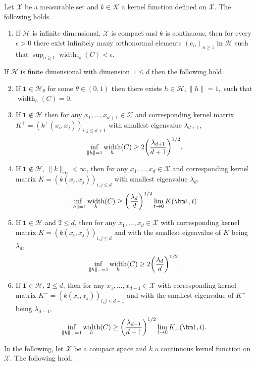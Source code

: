 \documentclass[AHL,Unicode,longabstracts,published]{cedram}
\theoremstyle{remark}
\DeclareMathOperator{\diam}{width}
\newcommand{\X}{\mathcal{X}}
\newcommand{\cH}{\mathcal{H}}
\newcommand{\clK}{\mathcal{K}}
\renewcommand*{\to}{\mathchoice{\longrightarrow}{\rightarrow}{\rightarrow}{\rightarrow}}
\let\originalleft\left
\let\originalright\right
\renewcommand{\left}{\mathopen{}\mathclose\bgroup\originalleft}
\renewcommand{\right}{\aftergroup\egroup\originalright}
\begin{document}
\begin{prop}\label{prop:approx_lower_bnd}
Let $\X$ be a measurable set and $k \in \clK$ a kernel function defined on $\X$. The following holds.
\begin{enumerate}
\item\label{prop2.10.1} If $\cH$ is infinite dimensional, $\X$ is compact and $k$ is continuous, then for every $\epsilon>0$ there exist infinitely many orthonormal elements $(e_n)_{n \geq 1}$ in $\cH$ such that $\sup_{n \geq 1} \diam_{e_n}(C) < \epsilon$.
\end{enumerate}
If $\cH$ is finite dimensional with dimension~$1 \leq d$ then the following hold.
\begin{enumerate}
\setcounter{enumi}{1}
\item\label{prop2.10.2} If $\bm 1 \in \cH_\theta$ for some $\theta\in (0,1)$ then there exists $h\in\cH, \|h\|=1,$ such that $\diam_h(C) = 0$.
\item\label{prop2.10.3} If $\bm 1 \not \in \cH$ then for any $x_1, \dots, x_{d+1} \in \X$ and corresponding kernel matrix $K^+ = (k^+(x_i,x_j))_{i,j\leq d+1}$ with smallest eigenvalue $\lambda_{d+1}$,
\[
\inf_{\|h\| = 1} \diam_h(C) \geq 2 \left(\frac{\lambda_{d+1}}{d+1}\right)^{1/2}.
\]
\item\label{prop2.10.4} If $\bm 1 \not \in \cH$, $\|k\|_\infty<\infty$, then for any $x_1, \dots, x_{d} \in \X$ and corresponding kernel matrix $K = (k(x_i,x_j))_{i,j\leq d}$ with smallest eigenvalue $\lambda_{d}$,
\[
\inf_{\|h\| = 1} \diam_h(C) \geq \left(\frac{\lambda_{d}}{d}\right)^{1/2} \lim_{t\to 0} K(\bm 1,t).
\]
\item\label{prop2.10.5} If $\bm 1 \in \cH$ and $2 \leq d$, then for any $x_1, \dots, x_{d} \in \X$ with corresponding kernel matrix $K = (k(x_i,x_j))_{i,j\leq d}$ and with the smallest eigenvalue of $K$ being $\lambda_{d}$,
\[
\inf_{\|h\|_- = 1} \diam_h(C) \geq 2 \left(\frac{\lambda_{d}}{d} \right)^{1/2}.
\]
\pagebreak{}
\item\label{prop2.10.6} If $\bm 1 \in \cH$, $2 \leq d$, then for any $x_1, \dots, x_{d-1} \in \X$ with corresponding kernel matrix $K^- = (k(x_i,x_j))_{i,j\leq d-1}$ and with the smallest eigenvalue of $K^-$ being $\lambda_{d-1}$,
\[
\inf_{\|h\|_- = 1} \diam_h(C) \geq \left(\frac{\lambda_{d-1}}{d-1} \right)^{1/2} \lim_{t \to 0} K_-(\bm 1,t).
\]
\end{enumerate}
In the following, let $\X$ be a compact space and $k$ a continuous kernel function on $\X$. The following hold.
\begin{enumerate}

\end{enumerate}
\end{prop}
\end{document}
